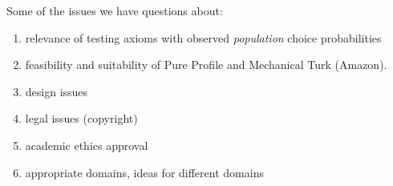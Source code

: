 \documentclass[11pt,letter]{amsart}
\begin{document}
Some of the issues we have questions about:
\begin{enumerate}
	\item relevance of testing axioms with observed {\em population} choice probabilities
	\item feasibility and suitability of Pure Profile and Mechanical Turk (Amazon).
	\item design issues
	\item legal issues (copyright)
	\item academic ethics approval
	\item appropriate domains, ideas for different domains
\end{enumerate}
\end{document}
